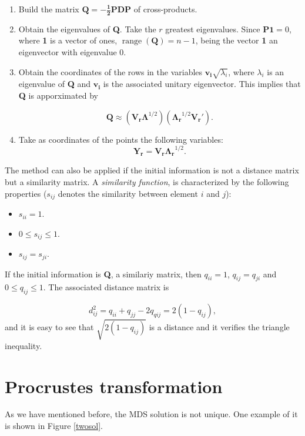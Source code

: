 \documentclass[11pt]{report}
\DeclareMathOperator{\range}{range}
\begin{document}
\begin{enumerate}
\item Build the matrix $\mathbf{Q = - \frac{1}{2} PDP}$ of cross-products.
\item Obtain the eigenvalues of \textbf{Q}. Take the $r$ greatest eigenvalues. 
Since $\mathbf{P1}=0$, where \textbf{1} is a vector of ones, 
$\range(\mathbf{Q})=n-1$, being the vector \textbf{1} an eigenvector with 
eigenvalue 0. 
\item Obtain the coordinates of the rows in the variables 
$\mathbf{v_i}\sqrt{\lambda_i}$,
where $\lambda_i$ is an eigenvalue of \textbf{Q} and $\mathbf{v_i}$ is the
associated unitary eigenvector. This implies that \textbf{Q} is apporximated by

\[
\mathbf{Q} \approx (\mathbf{V_r \Lambda}^{1/2})(\mathbf{\Lambda_r}^{1/2} \mathbf{V_r'}).
\]

\item Take as coordinates of the points the following variables:
\[
\mathbf{Y_r} = \mathbf{V_r}\mathbf{\Lambda_r}^{1/2}.
\]
\end{enumerate}

\indent The method can also be applied if the initial information is not a 
distance matrix but a similarity matrix. A \textit{similarity function}, 
is characterized by the following properties ($s_{ij}$ denotes the
similarity between element $i$ and $j$):


\begin{itemize}
\item $s_{ii} = 1$.
\item $0 \leq s_{ij} \leq 1$.
\item $s_{ij} = s_{ji}$.
\end{itemize}

If the initial information is \textbf{Q}, a similariy matrix, then $q_{ii} = 1$,
$q_{ij} = q_{ji}$ and $0 \leq q_{ij} \leq 1$. The associated distance matrix 
is

\[
d_{ij}^2 = q_{ii} + q_{jj} - 2q_{qij} = 2(1-q_{ij}),
\]
and it is easy to see that $\sqrt{2(1-q_{ij})}$ is a distance and it verifies
the triangle inequality.


\section{Procrustes transformation}
As we have mentioned before, the MDS solution is not unique. One example of it 
is shown in Figure \ref{twosol}.
\end{document}
